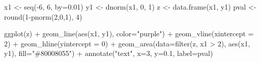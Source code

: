 \documentclass[
]{book}
\newenvironment{Shaded}{\begin{snugshade}}{\end{snugshade}}
\newcommand{\AttributeTok}[1]{\textcolor[rgb]{0.77,0.63,0.00}{#1}}
\newcommand{\DecValTok}[1]{\textcolor[rgb]{0.00,0.00,0.81}{#1}}
\newcommand{\FloatTok}[1]{\textcolor[rgb]{0.00,0.00,0.81}{#1}}
\newcommand{\FunctionTok}[1]{\textcolor[rgb]{0.00,0.00,0.00}{#1}}
\newcommand{\NormalTok}[1]{#1}
\newcommand{\OtherTok}[1]{\textcolor[rgb]{0.56,0.35,0.01}{#1}}
\newcommand{\SpecialCharTok}[1]{\textcolor[rgb]{0.00,0.00,0.00}{#1}}
\newcommand{\StringTok}[1]{\textcolor[rgb]{0.31,0.60,0.02}{#1}}
\begin{document}
\begin{Shaded}
\begin{Highlighting}[]

\NormalTok{x1 }\OtherTok{\textless{}{-}} \FunctionTok{seq}\NormalTok{(}\SpecialCharTok{{-}}\DecValTok{6}\NormalTok{, }\DecValTok{6}\NormalTok{, }\AttributeTok{by=}\FloatTok{0.01}\NormalTok{)}
\NormalTok{y1 }\OtherTok{\textless{}{-}} \FunctionTok{dnorm}\NormalTok{(x1, }\DecValTok{0}\NormalTok{, }\DecValTok{1}\NormalTok{)}
\NormalTok{z }\OtherTok{\textless{}{-}} \FunctionTok{data.frame}\NormalTok{(x1, y1)}
\NormalTok{pval }\OtherTok{\textless{}{-}} \FunctionTok{round}\NormalTok{(}\DecValTok{1}\SpecialCharTok{{-}}\FunctionTok{pnorm}\NormalTok{(}\DecValTok{2}\NormalTok{,}\DecValTok{0}\NormalTok{,}\DecValTok{1}\NormalTok{), }\DecValTok{4}\NormalTok{)}

\FunctionTok{ggplot}\NormalTok{(z) }\SpecialCharTok{+}
  \FunctionTok{geom\_line}\NormalTok{(}\FunctionTok{aes}\NormalTok{(x1, y1), }\AttributeTok{color=}\StringTok{"purple"}\NormalTok{) }\SpecialCharTok{+}
  \FunctionTok{geom\_vline}\NormalTok{(}\AttributeTok{xintercept =} \DecValTok{2}\NormalTok{) }\SpecialCharTok{+}
  \FunctionTok{geom\_hline}\NormalTok{(}\AttributeTok{yintercept =} \DecValTok{0}\NormalTok{) }\SpecialCharTok{+}
  \FunctionTok{geom\_area}\NormalTok{(}\AttributeTok{data=}\FunctionTok{filter}\NormalTok{(z, x1 }\SpecialCharTok{\textgreater{}} \DecValTok{2}\NormalTok{), }
            \FunctionTok{aes}\NormalTok{(x1, y1), }
            \AttributeTok{fill=}\StringTok{"\#80008055"}\NormalTok{) }\SpecialCharTok{+}
  \FunctionTok{annotate}\NormalTok{(}\StringTok{"text"}\NormalTok{, }\AttributeTok{x=}\DecValTok{3}\NormalTok{, }\AttributeTok{y=}\FloatTok{0.1}\NormalTok{, }\AttributeTok{label=}\NormalTok{pval) }
\end{Highlighting}
\end{Shaded}
\end{document}
